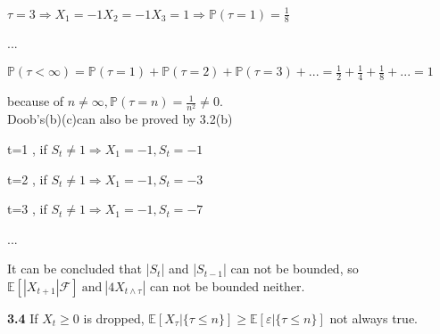 \begin{enumerate}[(a)]
    $\tau=3 \Rightarrow X_1=-1 X_2=-1 X_3=1 \Rightarrow \mathbb{P}(\tau=1)=\frac{1}{8}$
     	
    ...
    
    $\mathbb{P}(\tau<\infty)=\mathbb{P}(\tau=1)+\mathbb{P}(\tau=2)+\mathbb{P}(\tau=3)+...
    =\frac{1}{2}+\frac{1}{4}+\frac{1}{8}+...=1$
    
    because of $n\not=\infty,\mathbb{P}(\tau=n)=\frac{1}{n^2}\not=0$.\\
    Doob's(b)(c)can also be proved by 3.2(b)
    
    t=1 , if $S_t\not=1 \Rightarrow X_1=-1 , S_t=-1$
    
    t=2 , if $S_t\not=1 \Rightarrow X_1=-1 , S_t=-3$
    
    t=3 , if $S_t\not=1 \Rightarrow X_1=-1 , S_t=-7$
    
    ...
    
    It can be concluded that |$S_t$| and |$S_{t-1}$| can not be bounded, so $\mathbb{E}[|X_{t+1}|\mathcal{F}]\ \text{and}\ |4X_{t\wedge\tau}|$ can not be bounded neither.
    
    \end{enumerate}


\noindent\textbf{3.4} If $X_t\ge0$ is dropped, $\mathbb{E}[X_\tau|\{\tau\le n\}] \ge \mathbb{E}[\varepsilon|\{\tau\le n\}]$ not always true.
